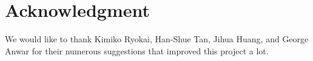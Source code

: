 \section{Acknowledgment}\label{sec:ack}
We would like to thank Kimiko Ryokai, Han-Shue Tan, Jihua Huang, and George Anwar for their numerous suggestions that improved this project a lot.
